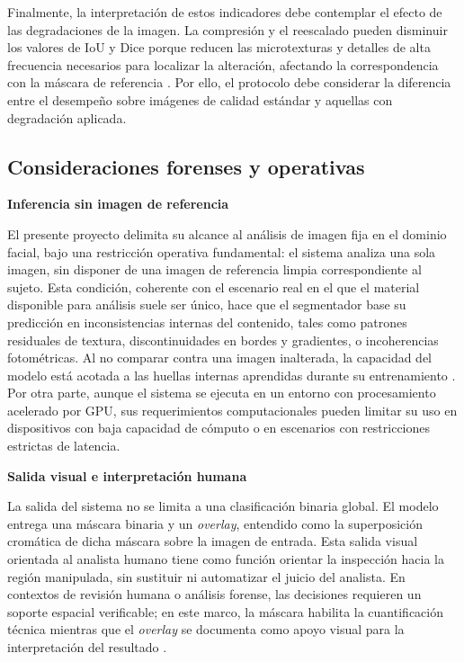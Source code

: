 Finalmente, la interpretación de estos indicadores debe contemplar el efecto de las degradaciones de la imagen. La compresión y el reescalado pueden disminuir los valores de IoU y Dice porque reducen las microtexturas y detalles de alta frecuencia necesarios para localizar la alteración, afectando la correspondencia con la máscara de referencia \parencite{Gao2024, LiM2025}. Por ello, el protocolo debe considerar la diferencia entre el desempeño sobre imágenes de calidad estándar y aquellas con degradación aplicada.

\subsection{Consideraciones forenses y operativas}

\medskip\textbf{Inferencia sin imagen de referencia}

El presente proyecto delimita su alcance al análisis de imagen fija en el dominio facial, bajo una restricción operativa fundamental: el sistema analiza una sola imagen, sin disponer de una imagen de referencia limpia correspondiente al sujeto. Esta condición, coherente con el escenario real en el que el material disponible para análisis suele ser único, hace que el segmentador base su predicción en inconsistencias internas del contenido, tales como patrones residuales de textura, discontinuidades en bordes y gradientes, o incoherencias fotométricas. Al no comparar contra una imagen inalterada, la capacidad del modelo está acotada a las huellas internas aprendidas durante su entrenamiento \parencite{Amerini2025, Li2025}. Por otra parte, aunque el sistema se ejecuta en un entorno con procesamiento acelerado por GPU, sus requerimientos computacionales pueden limitar su uso en dispositivos con baja capacidad de cómputo o en escenarios con restricciones estrictas de latencia.

\medskip\textbf{Salida visual e interpretación humana}

La salida del sistema no se limita a una clasificación binaria global. El modelo entrega una máscara binaria y un \textit{overlay}, entendido como la superposición cromática de dicha máscara sobre la imagen de entrada. Esta salida visual orientada al analista humano tiene como función orientar la inspección hacia la región manipulada, sin sustituir ni automatizar el juicio del analista. En contextos de revisión humana o análisis forense, las decisiones requieren un soporte espacial verificable; en este marco, la máscara habilita la cuantificación técnica mientras que el \textit{overlay} se documenta como apoyo visual para la interpretación del resultado \parencite{Xu2024, Miao2025, Amerini2025}. 

